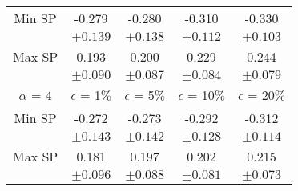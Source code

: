 \begin{table*}[b]
\begin{center}
\begin{subtable}{0.48\textwidth}
\begin{tabular}{ccccc}
            \\ 
            \hline
            Min SP & -0.279 & -0.280 & -0.310 & -0.330 \\
            & $\pm 0.139$ & $\pm 0.138$ & $\pm 0.112$ & $\pm 0.103$\\ 
            \hline
            Max SP & 0.193 & 0.200 & 0.229 & 0.244\\ 
            & $\pm 0.090$ & $\pm 0.087$ & $\pm 0.084$ & $\pm 0.079$\\ 
            \hline
            \hline
            $\alpha$ = 4 & $\epsilon$ = 1$\%$ & $\epsilon$ = 5$\%$ & $\epsilon$ = 10$\%$ & $\epsilon$ = 20$\%$\\ 
            \hline
            Min SP & -0.272 & -0.273 & -0.292 & -0.312\\
            & $\pm 0.143$ & $\pm 0.142$ & $\pm 0.128$ & $\pm 0.114$ \\ 
            \hline
            Max SP & 0.181 & 0.197 & 0.202 & 0.215\\ 
            & $\pm 0.096$ & $\pm 0.088$ & $\pm 0.081$ & $\pm 0.073$\\ 
            \hline
    \end{tabular} 
    \label{tab:effect2_dds}
\end{subtable}
\end{center}
\end{table*}